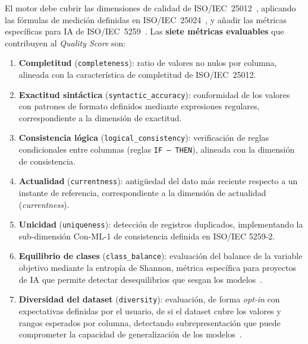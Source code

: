 El motor debe cubrir las dimensiones de calidad de
\ac{ISO}/IEC~25012~\citep{iso25012}, aplicando las fórmulas de medición
definidas en \ac{ISO}/IEC~25024~\citep{iso25024}, y añadir las métricas
específicas para \ac{IA} de \ac{ISO}/IEC~5259~\citep{iso5259}.  Las \textbf{siete
métricas evaluables} que contribuyen al \emph{Quality Score} son:

\begin{enumerate}
  \item \textbf{Completitud} (\texttt{completeness}): ratio de valores no
    nulos por columna, alineada con la característica de completitud de
    \ac{ISO}/IEC~25012.

  \item \textbf{Exactitud sintáctica} (\texttt{syntactic\_accuracy}):
    conformidad de los valores con patrones de formato definidos mediante
    expresiones regulares, correspondiente a la dimensión de exactitud.

  \item \textbf{Consistencia lógica} (\texttt{logical\_consistency}):
    verificación de reglas condicionales entre columnas (reglas
    \texttt{IF\,--\,THEN}), alineada con la dimensión de consistencia.

  \item \textbf{Actualidad} (\texttt{currentness}): antigüedad del dato más
    reciente respecto a un instante de referencia, correspondiente a la
    dimensión de actualidad (\emph{currentness}).

  \item \textbf{Unicidad} (\texttt{uniqueness}): detección de registros
    duplicados, implementando la sub-dimensión Con-ML-1 de consistencia
    definida en \ac{ISO}/IEC 5259-2.

  \item \textbf{Equilibrio de clases} (\texttt{class\_balance}): evaluación
    del balance de la variable objetivo mediante la entropía de Shannon,
    métrica específica para proyectos de \ac{IA} que permite detectar
    desequilibrios que sesgan los modelos~\citep{ng2021datacentric}.

  \item \textbf{Diversidad del dataset} (\texttt{diversity}): evaluación,
    de forma \emph{opt-in} con expectativas definidas por el usuario, de si
    el dataset cubre los valores y rangos esperados por columna, detectando
    subrepresentación que puede comprometer la capacidad de generalización
    de los modelos~\citep{iso5259}.
\end{enumerate}

